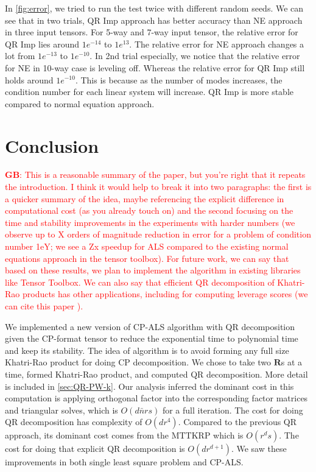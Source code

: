\documentclass{article}
\newcommand{\mat}[1]{\mathbf{#1}}
\newcommand{\GB}[1]{\textcolor{red}{\textbf{GB}: #1}}
\begin{document}
In \cref{fig:error}, we tried to run the test twice with different random seeds. 
We can see that in two trials, QR Imp approach has better accuracy than NE approach in three input tensors.
For 5-way and 7-way input tensor, the relative error for QR Imp lies around $1e^{-14}$ to $1e^{13}$.
The relative error for NE approach changes a lot from $1e^{-13}$ to $1e^{-10}$.
In 2nd trial especially, we notice that the relative error for NE in 10-way case is leveling off.
Whereas the relative error for QR Imp still holds around $1e^{-10}$.
This is because as the number of modes increases, the condition number for each linear system will increase.
QR Imp is more stable compared to normal equation approach.




\section{Conclusion}
\label{sec:conclusion}

\GB{This is a reasonable summary of the paper, but you're right that it repeats the introduction.  I think it would help to break it into two paragraphs: the first is a quicker summary of the idea, maybe referencing the explicit difference in computational cost (as you already touch on) and the second focusing on the time and stability improvements in the experiments with harder numbers (we observe up to X orders of magnitude reduction in error for a problem of condition number 1eY; we see a Zx speedup for ALS compared to the existing normal equations approach in the tensor toolbox).  For future work, we can say that based on these results, we plan to implement the algorithm in existing libraries like Tensor Toolbox.  We can also say that efficient QR decomposition of Khatri-Rao products has other applications, including for computing leverage scores (we can cite this paper \cite{bharadwaj2023fast}).}


We implemented a new version of CP-ALS algorithm with QR decomposition given the CP-format tensor to reduce the exponential time to polynomial time and keep its stability.
The idea of algorithm is to avoid forming any full size Khatri-Rao product for doing CP decomposition. 
We chose to take two $\mat{R}$s at a time, formed Khatri-Rao product, and computed QR decomposition.
More detail is included in \cref{sec:QR-PW-k}.
Our analysis inferred the dominant cost in this computation is applying orthogonal factor into the corresponding factor matrices and triangular solves, which is $O(d \bar n rs)$ for a full iteration.
The cost for doing QR decomposition has complexity of $O(dr^4)$. Compared to the previous QR approach, its dominant cost comes from the MTTKRP which is $O(r^ds)$.
The cost for doing that explicit QR decomposition is $O(dr^{d+1})$.
We saw these improvements in both single least square problem and CP-ALS.
\end{document}
